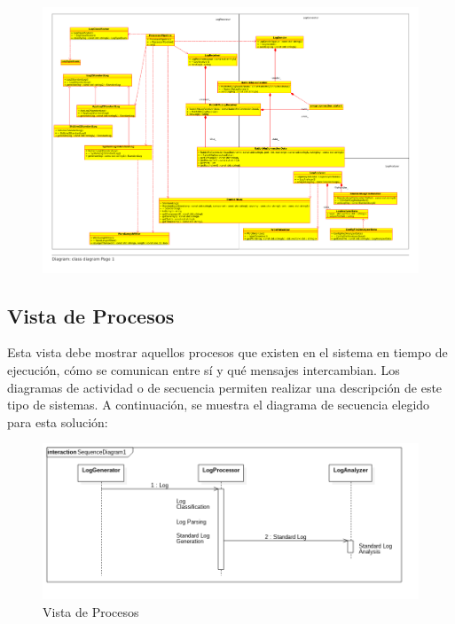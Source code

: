 \documentclass[11pt]{article}
\begin{document}
\begin{landscape}
\begin{center}
 \begin{figure}[H]
 \begin{center}
\includegraphics[scale=0.85]{classes01.pdf}
   \label{fig:classes_per_component}
 \end{center}
 \end{figure}
\end{center}
\end{landscape}
\restoregeometry

\subsection{Vista de Procesos}
Esta vista debe mostrar aquellos procesos que existen en el sistema en tiempo de ejecución, cómo se comunican entre sí y qué mensajes intercambian. Los diagramas de actividad o de secuencia permiten realizar una descripción de este tipo de sistemas. A continuación, se muestra el diagrama de secuencia elegido para esta solución:

\begin{center}
 \begin{figure}[H]
 \begin{center}
   \includegraphics[width=16cm]{img/process_view00.png}
   \caption{Vista de Procesos}
   \label{fig:4plus1views}
 \end{center}
 \end{figure}
\end{center}
\end{document}
